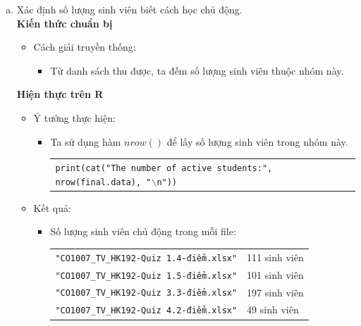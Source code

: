 \documentclass[a4paper]{article}
\theoremstyle{definition}
\begin{document}
\begin{enumerate}[a)]
\begin{itemize}
\begin{itemize}
\begin{center}
\begin{tabular}{l l}
                \end{tabular}
            \end{center}
        \end{itemize}
    \end{itemize}
    \bf\item {Xác định số lượng sinh viên biết cách học chủ động.}\\[6pt]
    \bf Kiến thức chuẩn bị\normalfont
    \begin{itemize}
        \item Cách giải truyền thống:
        \begin{itemize}
            \item Từ danh sách thu được, ta đếm số lượng sinh viên thuộc nhóm này.
        \end{itemize}
    \end{itemize}
    \bf Hiện thực trên R\normalfont
    \begin{itemize}
        \item Ý tưởng thực hiện:
        \begin{itemize}
            \item Ta sử dụng hàm $nrow()$ để lấy số lượng sinh viên trong nhóm này.
            \begin{center}
                \begin{tabular}{p{13cm}}
                    \texttt{print(cat("The number of active students:", nrow(final.data), "$\backslash$n"))}
                \end{tabular}
            \end{center}
        \end{itemize}
        \item Kết quả:
        \begin{itemize}
            \item Số lượng sinh viên chủ động trong mỗi file:
            \begin{center}
                \begin{tabular}{l l}
                     \texttt{"CO1007\_TV\_HK192-Quiz 1.4-điểm.xlsx"} & 111 sinh viên\\
                     \texttt{"CO1007\_TV\_HK192-Quiz 1.5-điểm.xlsx"} & 101 sinh viên\\
                     \texttt{"CO1007\_TV\_HK192-Quiz 3.3-điểm.xlsx"} & 197 sinh viên\\
                     \texttt{"CO1007\_TV\_HK192-Quiz 4.2-điểm.xlsx"} & 49 sinh viên\\
                \end{tabular}

\end{center}
\end{itemize}
\end{itemize}
\end{enumerate}
\end{document}
